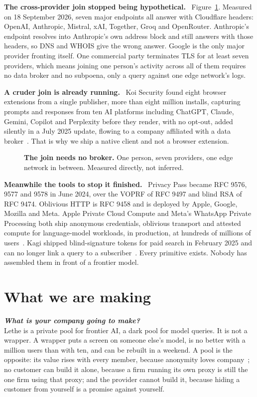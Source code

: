 \documentclass[9pt,twocolumn,a4paper]{extarticle}
\newcommand{\para}[1]{\vspace{3pt}\textbf{#1}\ }
\newcommand{\q}[1]{{\fontsize{7}{9}\selectfont\bfseries\itshape\color{indigo!80!black}#1}\\[2pt]}
\begin{document}
\para{The cross-provider join stopped being hypothetical.} Figure~\ref{fig:join}. Measured on 18 September 2026, seven major endpoints all answer with Cloudflare headers: OpenAI, Anthropic, Mistral, xAI, Together, Groq and OpenRouter. Anthropic's endpoint resolves into Anthropic's own address block and still answers with those headers, so DNS and WHOIS give the wrong answer. Google is the only major provider fronting itself. One commercial party terminates TLS for at least seven providers, which means joining one person's activity across all of them requires no data broker and no subpoena, only a query against one edge network's logs.

\para{A cruder join is already running.} Koi Security found eight browser extensions from a single publisher, more than eight million installs, capturing prompts and responses from ten AI platforms including ChatGPT, Claude, Gemini, Copilot and Perplexity before they render, with no opt-out, added silently in a July 2025 update, flowing to a company affiliated with a data broker~\cite{koi}. That is why we ship a native client and not a browser extension.

\begin{figure}[t]
\centering
{}
\caption{\textbf{The join needs no broker.} One person, seven providers, one edge network in between. Measured directly, not inferred.}
\label{fig:join}
\end{figure}

\para{Meanwhile the tools to stop it finished.} Privacy Pass became RFC 9576, 9577 and 9578 in June 2024, over the VOPRF of RFC 9497 and blind RSA of RFC 9474. Oblivious HTTP is RFC 9458 and is deployed by Apple, Google, Mozilla and Meta. Apple Private Cloud Compute and Meta's WhatsApp Private Processing both ship anonymous credentials, oblivious transport and attested compute for language-model workloads, in production, at hundreds of millions of users~\cite{pcc}. Kagi shipped blind-signature tokens for paid search in February 2025 and can no longer link a query to a subscriber~\cite{kagi}. Every primitive exists. Nobody has assembled them in front of a frontier model.

\section{What we are making}
\q{What is your company going to make?}
Lethe is a private pool for frontier AI, a dark pool for model queries. It is not a wrapper. A wrapper puts a screen on someone else's model, is no better with a million users than with ten, and can be rebuilt in a weekend. A pool is the opposite: its value rises with every member, because anonymity loves company~\cite{alc}; no customer can build it alone, because a firm running its own proxy is still the one firm using that proxy; and the provider cannot build it, because hiding a customer from yourself is a promise against yourself.
\end{document}
